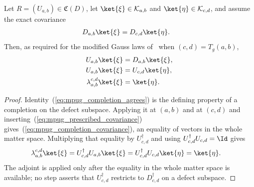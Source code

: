 \begin{lemma}
    \label{thm:mpug_completion_transport}
    \leanok
    Let $R=(U_{a,b})\in\mathfrak C(D)$, let
    $\ket{\xi}\in\mathcal K_{a,b}$ and $\ket{\eta}\in\mathcal K_{c,d}$, and
    assume the exact covariance
    \begin{align}
        D_{a,b}\ket{\xi} & =D_{c,d}\ket{\eta}.
        \label{eq:mpug_prescribed_covariance}
    \end{align}
    Then, as required for the modified Gauss laws
    of~\cite[lines~4325--4335]{FrancoRubio2025MPUGauging} when $(c,d)=T_g(a,b)$,
    \begin{align}
        U_{a,b}\ket{\xi}             & =D_{a,b}\ket{\xi},
        \label{eq:mpug_completion_agrees}                  \\
        U_{a,b}\ket{\xi}             & =U_{c,d}\ket{\eta},
        \label{eq:mpug_completion_covariance}              \\
        \lambda_{a,b}^{c,d}\ket{\xi} & =\ket{\eta}.
        \label{eq:mpug_completion_transport}
    \end{align}
\end{lemma}
\begin{proof}\leanok
    Identity~(\ref{eq:mpug_completion_agrees}) is the defining property of a
    completion on the defect subspace. Applying it at $(a,b)$ and at $(c,d)$
    and inserting~(\ref{eq:mpug_prescribed_covariance})
    gives~(\ref{eq:mpug_completion_covariance}), an equality of vectors in the
    whole matter space. Multiplying that equality by $U_{c,d}^\dagger$ and
    using $U_{c,d}^\dagger U_{c,d}=\Id$ gives
    \begin{align}
        \lambda_{a,b}^{c,d}\ket{\xi}
         & =U_{c,d}^\dagger U_{a,b}\ket{\xi}
        =U_{c,d}^\dagger U_{c,d}\ket{\eta}
        =\ket{\eta}.
    \end{align}
    The adjoint is applied only after the equality in the whole matter space
    is available; no step asserts that $U_{c,d}^\dagger$ restricts to
    $D_{c,d}^\dagger$ on a defect subspace.
\end{proof}

